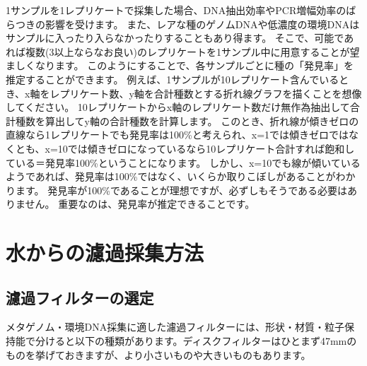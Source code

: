 \documentclass[titlepage,10pt,a4paper]{jsbook}
\begin{document}
1サンプルを1レプリケートで採集した場合、DNA抽出効率やPCR増幅効率のばらつきの影響を受けます。
また、レアな種のゲノムDNAや低濃度の環境DNAはサンプルに入ったり入らなかったりすることもあり得ます。
そこで、可能であれば複数(3以上ならなお良い)のレプリケートを1サンプル中に用意することが望ましくなります。
このようにすることで、各サンプルごとに種の「発見率」を推定することができます。
例えば、1サンプルが10レプリケート含んでいるとき、x軸をレプリケート数、y軸を合計種数とする折れ線グラフを描くことを想像してください。
10レプリケートからx軸のレプリケート数だけ無作為抽出して合計種数を算出してy軸の合計種数を計算します。
このとき、折れ線が傾きゼロの直線なら1レプリケートでも発見率は100\%と考えられ、x=1では傾きゼロではなくとも、x=10では傾きゼロになっているなら10レプリケート合計すれば飽和している＝発見率100\%ということになります。
しかし、x=10でも線が傾いているようであれば、発見率は100\%ではなく、いくらか取りこぼしがあることがわかります。
発見率が100\%であることが理想ですが、必ずしもそうである必要はありません。
重要なのは、発見率が推定できることです。

\section{水からの濾過採集方法}

\subsection{濾過フィルターの選定}

メタゲノム・環境DNA採集に適した濾過フィルターには、形状・材質・粒子保持能で分けると以下の種類があります。ディスクフィルターはひとまず47mmのものを挙げておきますが、より小さいものや大きいものもあります。
\end{document}

